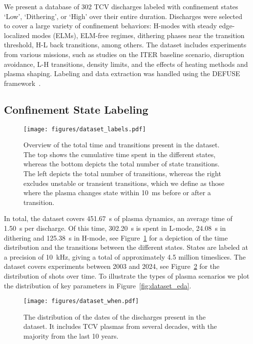 
We present a database of 302 TCV discharges labeled with confinement states `Low', `Dithering', or `High' over their entire duration. Discharges were selected to cover a large variety of confinement behaviors: H-modes with steady edge-localized modes (ELMs), ELM-free regimes, dithering phases near the transition threshold, H-L back transitions, among others. The dataset includes experiments from various missions, such as studies on the ITER baseline scenario, disruption avoidance, L-H transitions, density limits, and the effects of heating methods and plasma shaping. Labeling and data extraction was handled using the DEFUSE framework~\cite{defuseiaea}.

\subsection{Confinement State Labeling}

\begin{figure}[t]
\begin{center}\texttt{[image: figures/dataset\_labels.pdf]}\end{center}
    \caption{Overview of the total time and transitions present in the dataset. The top shows the cumulative time spent in the different states, whereas the bottom depicts the total number of state transitions. The left depicts the total number of transitions, whereas the right excludes unstable or transient transitions, which we define as those where the plasma changes state within \SI{10}{\milli\second} before or after a transition.}
    \label{fig:dataset_labels}%
\end{figure}

In total, the dataset covers \SI{451.67}{\second} of plasma dynamics, an average time of \SI{1.50}{\second} per discharge. Of this time, \SI{302.20}{\second} is spent in L-mode, \SI{24.08}{\second} in dithering and \SI{125.38}{\second} in H-mode, see Figure~\ref{fig:dataset_labels} for a depiction of the time distribution and the transitions between the different states. States are labeled at a precision of \SI{10}{\kilo\hertz}, giving a total of approximately 4.5 million timeslices. The dataset covers experiments between 2003 and 2024, see Figure~\ref{fig:dataset_when} for the distribution of shots over time. To illustrate the types of plasma scenarios we plot the distribution of key parameters in Figure~\ref{fig:dataset_eda}.

\begin{figure}[t]
\begin{center}\texttt{[image: figures/dataset\_when.pdf]}\end{center}
    \caption{The distribution of the dates of the discharges present in the dataset. It includes TCV plasmas from several decades, with the  majority from the last 10 years.}
    \label{fig:dataset_when}%
\end{figure}


